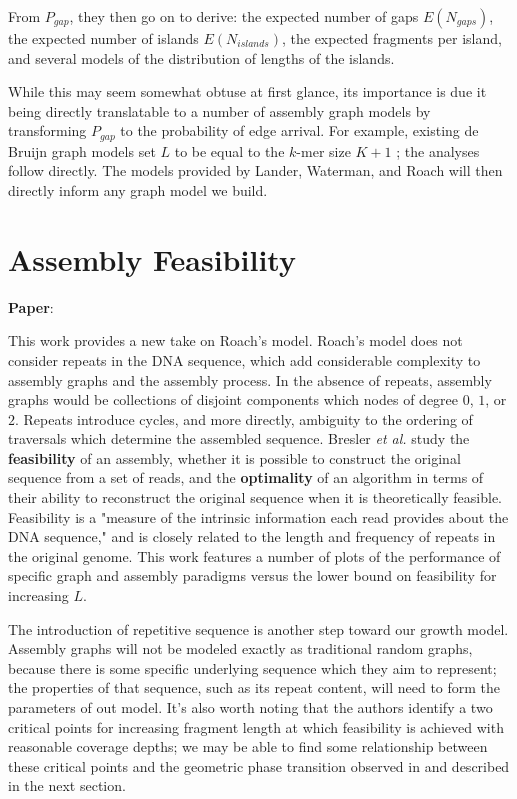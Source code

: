 \documentclass[]{article}
\begin{document}
From $P_{gap}$, they then go on to derive: the expected number of gaps
$E(N_{gaps})$, the expected number of islands $E(N_{islands})$, the expected fragments
per island, and several models of the distribution of lengths of the islands.

While this may seem somewhat obtuse at first glance, its importance is due it being
directly translatable to a number of assembly graph models by transforming $P_{gap}$
to the probability of edge arrival. For example, existing de Bruijn graph models
set $L$ to be equal to the $k$-mer size $K + 1$ \cite{bresler_optimal_2013}; the analyses 
follow directly. The models provided by Lander, Waterman, and Roach will then directly 
inform any graph model we build.

\section{Assembly Feasibility}

\textbf{Paper}: 

This work provides a new take on Roach's model. Roach's model does not consider repeats
in the DNA sequence, which add considerable complexity to assembly graphs and the assembly
process. In the absence of repeats, assembly graphs would be collections of disjoint
components which nodes of degree $0$, $1$, or $2$. Repeats introduce cycles, and more
directly, ambiguity to the ordering of traversals which determine the assembled sequence.
Bresler \emph{et al.} study the \textbf{feasibility} of an assembly, whether 
it is possible to construct the original sequence from a set of reads, and the 
\textbf{optimality} of an algorithm in terms of their ability to reconstruct the original
sequence when it is theoretically feasible. Feasibility is a "measure of the intrinsic 
information each read provides about the DNA sequence," and is closely related to the 
length and frequency of repeats in the original genome. This work features a number of 
plots of the performance of specific graph and assembly paradigms versus the lower bound 
on feasibility for increasing $L$. 

The introduction of repetitive sequence is another step toward our growth model. Assembly 
graphs will not be modeled exactly as traditional random graphs, because there is some 
specific underlying sequence which they aim to represent; the properties of that sequence,
such as its repeat content, will need to form the parameters of out model. It's also 
worth noting that the authors identify a two critical points for increasing fragment 
length at which feasibility is achieved with reasonable coverage depths; we may be able 
to find some relationship between these critical points and the geometric phase 
transition observed in \cite{pell_scaling_2012} and described in the next section.
\end{document}
